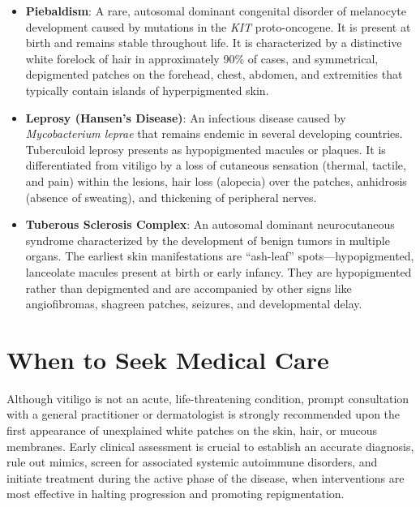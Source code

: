 \begin{itemize}
    \item \textbf{Piebaldism}: A rare, autosomal dominant congenital disorder of melanocyte development caused by mutations in the \textit{KIT} proto-oncogene. It is present at birth and remains stable throughout life. It is characterized by a distinctive white forelock of hair in approximately 90\% of cases, and symmetrical, depigmented patches on the forehead, chest, abdomen, and extremities that typically contain islands of hyperpigmented skin.
    \item \textbf{Leprosy (Hansen's Disease)}: An infectious disease caused by \textit{Mycobacterium leprae} that remains endemic in several developing countries. Tuberculoid leprosy presents as hypopigmented macules or plaques. It is differentiated from vitiligo by a loss of cutaneous sensation (thermal, tactile, and pain) within the lesions, hair loss (alopecia) over the patches, anhidrosis (absence of sweating), and thickening of peripheral nerves.
    \item \textbf{Tuberous Sclerosis Complex}: An autosomal dominant neurocutaneous syndrome characterized by the development of benign tumors in multiple organs. The earliest skin manifestations are ``ash-leaf'' spots—hypopigmented, lanceolate macules present at birth or early infancy. They are hypopigmented rather than depigmented and are accompanied by other signs like angiofibromas, shagreen patches, seizures, and developmental delay.
\end{itemize}

\section*{When to Seek Medical Care}
Although vitiligo is not an acute, life-threatening condition, prompt consultation with a general practitioner or dermatologist is strongly recommended upon the first appearance of unexplained white patches on the skin, hair, or mucous membranes. Early clinical assessment is crucial to establish an accurate diagnosis, rule out mimics, screen for associated systemic autoimmune disorders, and initiate treatment during the active phase of the disease, when interventions are most effective in halting progression and promoting repigmentation.

